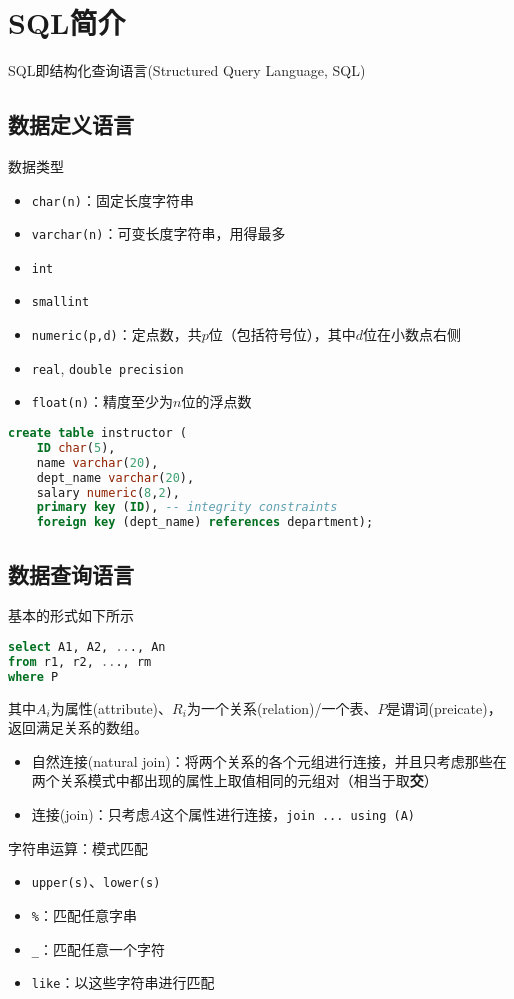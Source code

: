 
\section{SQL简介}
SQL即结构化查询语言(Structured Query Language, SQL)

\subsection{数据定义语言}
数据类型
\begin{itemize}
	\item \verb'char(n)'：固定长度字符串
	\item \verb'varchar(n)'：可变长度字符串，用得最多
	\item \verb'int'
	\item \verb'smallint'
	\item \verb'numeric(p,d)'：定点数，共$p$位（包括符号位），其中$d$位在小数点右侧
	\item \verb'real', \verb'double precision'
	\item \verb'float(n)'：精度至少为$n$位的浮点数
\end{itemize}
\begin{lstlisting}[language=sql]
create table instructor (
	ID char(5),
	name varchar(20),
	dept_name varchar(20),
	salary numeric(8,2),
	primary key (ID), -- integrity constraints
	foreign key (dept_name) references department);
\end{lstlisting}

\subsection{数据查询语言}
基本的形式如下所示
\begin{lstlisting}[language=sql]
select A1, A2, ..., An
from r1, r2, ..., rm
where P
\end{lstlisting}
其中$A_i$为属性(attribute)、$R_i$为一个关系(relation)/一个表、$P$是谓词(preicate)，返回满足关系的数组。

\begin{itemize}
	\item 自然连接(natural join)：将两个关系的各个元组进行连接，并且只考虑那些在两个关系模式中都出现的属性上取值相同的元组对（相当于取\textbf{交}）
	\item 连接(join)：只考虑$A$这个属性进行连接，\verb'join ... using (A)'
\end{itemize}

字符串运算：模式匹配
\begin{itemize}
	\item \verb'upper(s)'、\verb'lower(s)'
	\item \verb'%'：匹配任意字串
	\item \verb'_'：匹配任意一个字符
	\item \verb'like'：以这些字符串进行匹配
\end{itemize}

